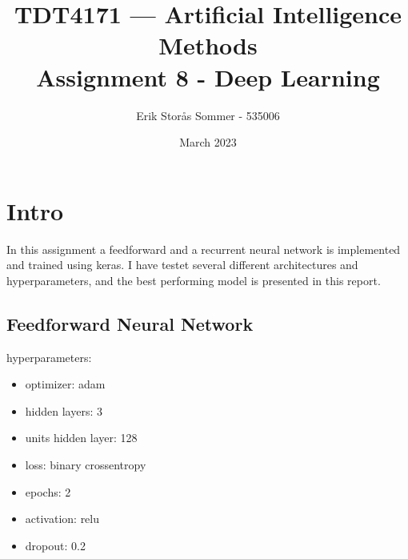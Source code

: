 \documentclass{article}
\title{TDT4171 — Artificial Intelligence Methods \\ Assignment 8 - Deep Learning}
\author{Erik Storås Sommer - 535006}
\date{March 2023}
\begin{document}
\maketitle
\setlength{\parindent}{0pt}

\section*{Intro}

In this assignment a feedforward and a recurrent neural network is implemented and trained using keras. 
I have testet several different architectures and hyperparameters, and the best performing model is presented in this report.

\subsection*{Feedforward Neural Network}

hyperparameters:
\begin{itemize}
    \item optimizer: adam
    \item hidden layers: 3
    \item units hidden layer: 128
    \item loss: binary crossentropy
    \item epochs: 2
    \item activation: relu
    \item dropout: 0.2
\end{itemize}
\end{document}
